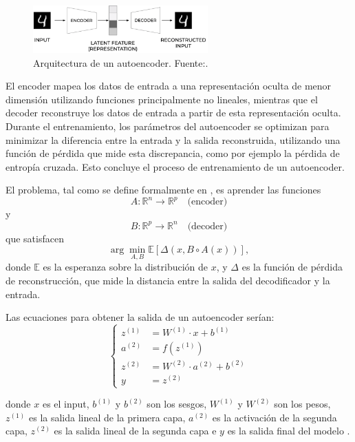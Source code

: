 \begin{figure}[h]
    \centering
    \includegraphics[width=0.6\textwidth]{img/AE4.png}
    \caption{Arquitectura de un autoencoder. Fuente:\citep{autoencoderImage}.}
    \label{fig:AE_architecture}
\end{figure}

El encoder mapea los datos de entrada a una representación oculta de menor dimensión utilizando funciones principalmente no lineales, mientras que el decoder reconstruye los datos de entrada a partir de esta representación oculta. Durante el entrenamiento, los parámetros del autoencoder se optimizan para minimizar la diferencia entre la entrada y la salida reconstruida, utilizando una función de pérdida que mide esta discrepancia, como por ejemplo la pérdida de entropía cruzada. Esto concluye el proceso de entrenamiento de un autoencoder.


El problema, tal como se define formalmente en \cite{bank2023autoencoders}, es aprender las funciones
\[
A : \mathbb{R}^n \rightarrow \mathbb{R}^p \quad \text{(encoder)}
\]
y
\[
B : \mathbb{R}^p \rightarrow \mathbb{R}^n \quad \text{(decoder)}
\]
que satisfacen
\[
\arg \min_{A, B} \mathbb{E}[\Delta(x, B \circ A(x))],
\]
donde $\mathbb{E}$ es la esperanza sobre la distribución de $x$, y $\Delta$ es la función de pérdida de reconstrucción, que mide la distancia entre la salida del decodificador y la entrada.


Las ecuaciones para obtener la salida de un autoencoder serían:
\[
\left\{
\begin{aligned}
z^{(1)} &= W^{(1)} \cdot x + b^{(1)} \\
a^{(2)} &= f(z^{(1)})  \\
z^{(2)} &= W^{(2)} \cdot a^{(2)} + b^{(2)}  \\
y &= z^{(2)} 
\end{aligned}
\right.
\]

donde  $x$ es el input, \( b^{(1)} \) y  \( b^{(2)} \) son los sesgos,  \( W^{(1)} \) y  \( W^{(2)} \) son los pesos, \( z^{(1)} \) es la salida lineal de la primera capa, \( a^{(2)} \) es la activación de la segunda capa, \( z^{(2)} \) es la salida lineal de la segunda capa e \( y \) es la salida final del modelo \citep{martinez2017analisis}.


